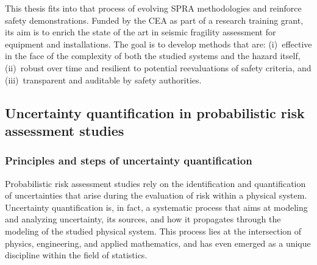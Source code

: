 This thesis fits into that process of evolving SPRA methodologies and reinforce safety demonstrations. Funded by the CEA as part of a research training grant, its aim is to enrich the state of the art in seismic fragility assessment for equipment and installations. The goal is to develop methods that are:
(i)~effective in the face of the complexity of both the studied systems and the hazard itself,
(ii)~robust over time and resilient to potential reevaluations of safety criteria, and
(iii)~transparent and auditable by safety authorities.


\subsection{Uncertainty quantification in probabilistic risk assessment studies}

\subsubsection{Principles and steps of uncertainty quantification}

Probabilistic risk assessment studies rely on the identification and quantification of uncertainties that arise during the evaluation of risk within a physical system. Uncertainty quantification is, in fact, a systematic process that aims at modeling and analyzing uncertainty, its sources, and how it propagates through the modeling of the studied physical system. This process lies at the intersection of physics, engineering, and applied mathematics, and has even emerged as a unique discipline  within the field of statistics.

